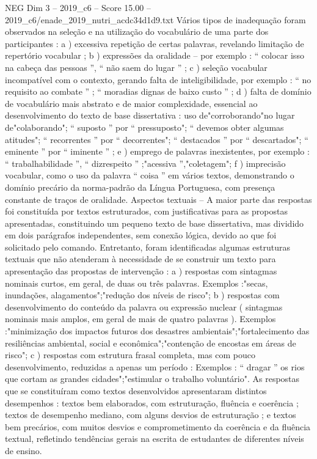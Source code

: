 \begin{textsample}{NEG Dim 3 – 2019\_c6 – Score 15.00 – 2019\_c6/enade\_2019\_nutri\_acdc34d1d9.txt}
Vários tipos de inadequação foram observados na seleção e na utilização do vocabulário de uma parte dos participantes : a ) excessiva repetição de certas palavras, revelando limitação de repertório vocabular ; b ) expressões da oralidade – por exemplo : “ colocar isso na cabeça das pessoas ”, “ não saem do lugar ” ; c ) seleção vocabular incompatível com o contexto, gerando falta de inteligibilidade, por exemplo : “ no requisito ao combate ” ; “ moradias dignas de baixo custo ” ; d ) falta de domínio de vocabulário mais abstrato e de maior complexidade, essencial ao desenvolvimento do texto de base dissertativa : uso de"corroborando"no lugar de"colaborando"; “ suposto ” por “ pressuposto"; “ devemos obter algumas atitudes"; “ recorrentes ” por “ decorrentes"; “ destacados ” por “ descartados"; “ eminente ” por “ iminente ” ; e ) emprego de palavras inexistentes, por exemplo : “ trabalhabilidade ”, “ dizrespeito ” ;"acessiva ”,"coletagem"; f ) imprecisão vocabular, como o uso da palavra “ coisa ” em vários textos, demonstrando o domínio precário da norma-padrão da Língua Portuguesa, com presença constante de traços de oralidade.
Aspectos textuais – A maior parte das respostas foi constituída por textos estruturados, com justificativas para as propostas apresentadas, constituindo um pequeno texto de base dissertativa, mas dividido em dois parágrafos independentes, sem conexão lógica, devido ao que foi solicitado pelo comando.
Entretanto, foram identificadas algumas estruturas textuais que não atenderam à necessidade de se construir um texto para apresentação das propostas de intervenção : a ) respostas com sintagmas nominais curtos, em geral, de duas ou três palavras.
Exemplos :"secas, inundações, alagamentos";"redução dos níveis de risco"; b ) respostas com desenvolvimento do conteúdo da palavra ou expressão nuclear ( sintagmas nominais mais amplos, em geral de mais de quatro palavras ).
Exemplos :"minimização dos impactos futuros dos desastres ambientais";"fortalecimento das resiliências ambiental, social e econômica";"contenção de encostas em áreas de risco"; c ) respostas com estrutura frasal completa, mas com pouco desenvolvimento, reduzidas a apenas um período : Exemplos : “ dragar ” os rios que cortam as grandes cidades";"estimular o trabalho voluntário".
As respostas que se constituíram como textos desenvolvidos apresentaram distintos desempenhos : textos bem elaborados, com estruturação, fluência e coerência ; textos de desempenho mediano, com alguns desvios de estruturação ; e textos bem precários, com muitos desvios e comprometimento da coerência e da fluência textual, refletindo tendências gerais na escrita de estudantes de diferentes níveis de ensino.

\end{textsample}
